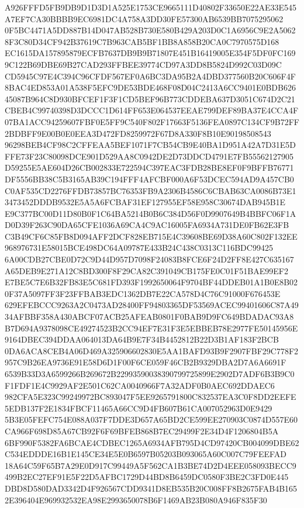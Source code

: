 \documentclass[UTF8,fontset=fandol,zihao=-4,a4paper]{ctexart}
\begin{document}
{{A926FFFD5FB9DB9D1D3D1A525E1753CE9665111D40802F33650E22AE33E545A7EF7CA30BBBB9EC6981DC4A758A3DD30FE57300AB6539BB7075295062
0F5BC4471A5DD887B14D047AB528B730E580B429A203D0C1A6956C9E2A50628F3C80D34CF942B37619C7B963CAB5BF1BB8A858B20CA0C7970575D168
EC1615DA157895879ECFB7637DB9B9B71807E451B16419005E354F5DF0FC1699C122B69DBE69B27CAD293FFBEE39774CD97A3DD8B5824D992C03D09C
CD5945C97E4C394C96CFDF567EF0A6BC3DA95B2A4DBD377560B20C606F4F8BAC4ED853A01A538F5EFC9DE53BDE468F08D04C2413A6CC9401E0BDB626
45087B964C8D930BFCEF1F3F1CD5BEF96B773CDDEBA637D3051C674D2C21CBEB4C99740398D3DCCC1D614FF653E064537EEAE799DEF89BA37E4CCA4F
07BA1ACC94259607FBF0E5FF9C540F802F17663F5136FEA0897C134CF9B72FF2BDBFF9E00B0E0EEA3D472FD8259972F67D8A330F8B10E90198508543
96298BEB4CF98C2CFFEAA5BEF1071F7CB54CB9E40BA1D951A42A7D31E5DFFE73F23C80098DCE901D529AA8C0942DE2D73DDCD4791E7FB55562127905
D59255E5AE604D26CB002833E722594C397EAC3FDB28BE8EF0F9BFFB76771DF5556BB38C5B3165AB39C194FFF4AFCBF000A6F53DCEC594AD9A457CB0
C0AF535CD2276FFDB73857BC76353FB9A2306B4586C6CBAB63CA0086B73E13473452DDDB9532E5A5A6FCBAF31EF127955EF58E958C30674DAB945B1E
E9C377BC00D11D80B0F1C64BA5214B0B6C384D56F0D9907649B4BBFC06F1AD0D39F263C90DA65CFE1036A69CA4C9AC16005FA6934A731DE0FB62E3FB
C3B49CF6C85FB8D094AFF2DCF828EB715E4C39608BE69D38A60C802F132EE968976731E58015BCE498DC64A09787E433B24C438C0313C116BDC99425
6A00CDB27CBE0D72C9D44D957D7098F24083B8FCE6F24D2FF8E427C635167A65DEB9E271A12C8BD300F8F29CA82C391049CB175FE0C01F51BAE99EF2
E7BE5C7E6B32FB83E5C681FD393F1992650064F9704BF44DDEB01A1B0E8B020F37A5097FF3F23FFBAB3EDC1362DB7E22CA578D4C76C91000F676453E
629EFEBCCC9263A2C0473AD28400FF94803365DF53569ACEC99401606C87A4934AFBBF358A430ABCF07ACB25AFEAB0801F0BAB9D9FC649BDADAC93A8
B7D694A9378098CE49274523B2CC94EF7E31F3E5EBBEB78E2977FE50145956E9164DBEC394DDAA064013DA64B9E7F34B4452812B22D3B1AF183F2BCB
0DA6ACA8CEB4A06D469A325906602830E5AA1BAFD93B9F2907FBF29C778F2957C9B26EA9736E91E58D6D1F00F6CE059F46CB2B9329DBA2D7A6A6691F
6539B33D3A6599266B269672B22993590038390799725899E2902D7ADF6B3B9C0F1FDF1E4C9929AF2E501C62CA0040966F7A32ADF0B0AEC692DDAEC6
982CFA5E323C99249972BC893047F5EE9265791800C832537EA3C0F8DD2EEFE5EDB137F2E1834FBCF11465A66CC9D4FB607B61CA007052963D0E9429
5B3E05FEFC754E088A037F7DDE3D657A65BD2CE599EE270903C0874D557E60CA966F698D85A67CB92F6F69BFEB868B7EC29499F2E34D4F1206804B5A
6BF990F5382FA6BCAE4CDBEC1265A6934AFB795D4CD97420CB004099DBE62C534EDDDE16B1E145CE34E5E0B6597B05203B093065A60C007C79FEEFAD
18A64C59F65B7A29E0D917C99449A5F562CA1B3BE74D2D4EEE058093BECC9499B2EC27EF91E5F22D5AFBC1729D44BD8B6459DC0580F3BE2C3FD0E445
DBD8D580DAD3342D4F926567CDD9341D8EB535B20C008FF8B2675FAB4B1652E396404E969932532EA98E2993650078B6F1469AB23B080A946F835F30
}}
\end{document}

